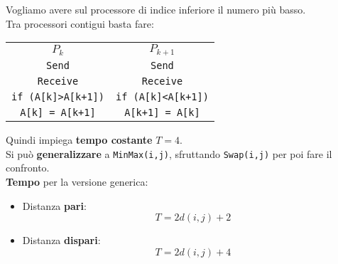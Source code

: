 Vogliamo avere sul processore di indice inferiore il numero più basso.\\

Tra processori contigui basta fare:
\begin{center}
	\begin{tabular}{c c}
		$P_k$ & $P_{k+1}$ \\
		\texttt{Send} & \texttt{Send} \\
		\texttt{Receive} & \texttt{Receive} \\
		\texttt{if (A[k]>A[k+1])} & \texttt{if (A[k]<A[k+1])} \\
		\texttt{A[k] = A[k+1]} & \texttt{A[k+1] = A[k]}
	\end{tabular}
\end{center}

Quindi impiega \textbf{tempo costante} $T = 4$.\\

Si può \textbf{generalizzare} a \texttt{MinMax(i,j)}, sfruttando \texttt{Swap(i,j)} per poi fare il confronto.\\

\textbf{Tempo} per la versione generica: 
\begin{itemize}
	\item Distanza \textbf{pari}: 
	$$ T = 2 d(i,j) + 2 $$
	\item Distanza \textbf{dispari}:
	$$ T = 2 d(i,j) + 4 $$
\end{itemize}

